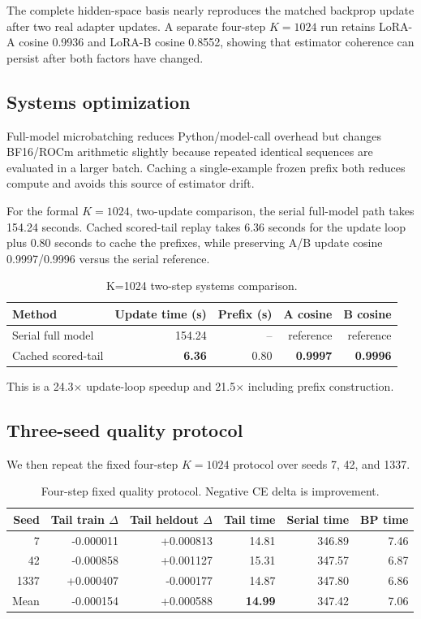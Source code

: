 \documentclass[11pt]{article}
\begin{document}
The complete hidden-space basis nearly reproduces the matched backprop update
after two real adapter updates. A separate four-step $K=1024$ run retains
LoRA-A cosine 0.9936 and LoRA-B cosine 0.8552, showing that estimator
coherence can persist after both factors have changed.

\subsection{Systems optimization}

Full-model microbatching reduces Python/model-call overhead but changes
BF16/ROCm arithmetic slightly because repeated identical sequences are
evaluated in a larger batch. Caching a single-example frozen prefix both
reduces compute and avoids this source of estimator drift.

For the formal $K=1024$, two-update comparison, the serial full-model path
takes 154.24 seconds. Cached scored-tail replay takes 6.36 seconds for the
update loop plus 0.80 seconds to cache the prefixes, while preserving A/B
update cosine 0.9997/0.9996 versus the serial reference.

\begin{table}[t]
\centering
\caption{K=1024 two-step systems comparison.}
\label{tab:systems}
\begin{tabular}{lrrrr}
\toprule
Method & Update time (s) & Prefix (s) & A cosine & B cosine \\
\midrule
Serial full model & 154.24 & -- & reference & reference \\
Cached scored-tail & \textbf{6.36} & 0.80 & \textbf{0.9997} & \textbf{0.9996} \\
\bottomrule
\end{tabular}
\end{table}

This is a 24.3$\times$ update-loop speedup and 21.5$\times$ including prefix
construction.

\subsection{Three-seed quality protocol}

We then repeat the fixed four-step $K=1024$ protocol over seeds
7, 42, and 1337.

\begin{table}[t]
\centering
\caption{Four-step fixed quality protocol. Negative CE delta is improvement.}
\label{tab:quality}
\begin{tabular}{rrrrrr}
\toprule
Seed & Tail train $\Delta$ & Tail heldout $\Delta$ & Tail time & Serial time & BP time \\
\midrule
7    & -0.000011 & +0.000813 & 14.81 & 346.89 & 7.46 \\
42   & -0.000858 & +0.001127 & 15.31 & 347.57 & 6.87 \\
1337 & +0.000407 & -0.000177 & 14.87 & 347.80 & 6.86 \\
\midrule
Mean & -0.000154 & +0.000588 & \textbf{14.99} & 347.42 & 7.06 \\
\bottomrule
\end{tabular}
\end{table}
\end{document}
